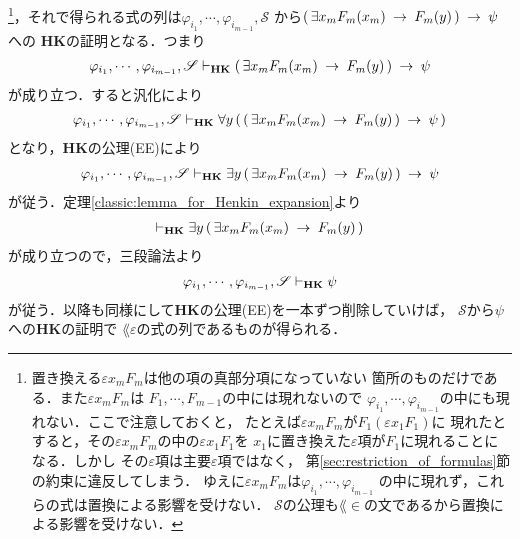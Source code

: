\begin{sketch}
		\footnote{
			置き換える$\varepsilon x_{m} F_{m}$は他の項の真部分項になっていない
			箇所のものだけである．また$\varepsilon x_{m} F_{m}$は
			$F_{1},\cdots,F_{m-1}$の中には現れないので
			$\varphi_{i_{1}},\cdots,\varphi_{i_{m-1}}$の中にも現れない．ここで注意しておくと，
			たとえば$\varepsilon x_{m} F_{m}$が$F_{1}(\varepsilon x_{1} F_{1})$に
			現れたとすると，その$\varepsilon x_{m} F_{m}$の中の$\varepsilon x_{1} F_{1}$を
			$x_{1}$に置き換えた$\varepsilon$項が$F_{1}$に現れることになる．しかし
			その$\varepsilon$項は主要$\varepsilon$項ではなく，
			第\ref{sec:restriction_of_formulas}節の約束に違反してしまう．
			ゆえに$\varepsilon x_{m} F_{m}$は$\varphi_{i_{1}},\cdots,\varphi_{i_{m-1}}$
			の中に現れず，これらの式は置換による影響を受けない．
			$\mathscr{S}$の公理も$\lang{\in}$の文であるから置換による影響を受けない．
		}，それで得られる式の列は$\varphi_{i_{1}},\cdots,\varphi_{i_{m-1}},\mathscr{S}$
		から$(\, \exists x_{m} F_{m}(x_{m}) \hspace{0.25em}\rightarrow\hspace{0.25em} F_{m}(y)\, ) \hspace{0.25em}\rightarrow\hspace{0.25em} \psi$への
		{\bf HK}の証明となる．つまり
		\begin{align}
			\varphi_{i_{1}},\cdots,\varphi_{i_{m-1}},\mathscr{S} 
			\vdash_{{\scriptsize \mbox{{\bf HK}}}} 
			(\, \exists x_{m} F_{m}(x_{m}) \hspace{0.25em}\rightarrow\hspace{0.25em} F_{m}(y)\, ) \hspace{0.25em}\rightarrow\hspace{0.25em} \psi
		\end{align}
		が成り立つ．すると汎化により
		\begin{align}
			\varphi_{i_{1}},\cdots,\varphi_{i_{m-1}},\mathscr{S} 
			\vdash_{{\scriptsize \mbox{{\bf HK}}}} 
			\forall y\, (\, (\, \exists x_{m} F_{m}(x_{m}) \hspace{0.25em}\rightarrow\hspace{0.25em} F_{m}(y)\, ) \hspace{0.25em}\rightarrow\hspace{0.25em} \psi\, )
		\end{align}
		となり，{\bf HK}の公理(EE)により
		\begin{align}
			\varphi_{i_{1}},\cdots,\varphi_{i_{m-1}},\mathscr{S} 
			\vdash_{{\scriptsize \mbox{{\bf HK}}}} 
			\exists y\, (\, \exists x_{m} F_{m}(x_{m}) \hspace{0.25em}\rightarrow\hspace{0.25em} F_{m}(y)\, ) \hspace{0.25em}\rightarrow\hspace{0.25em} \psi
		\end{align}
		が従う．定理\ref{classic:lemma_for_Henkin_expansion}より
		\begin{align}
			\vdash_{{\scriptsize \mbox{{\bf HK}}}} 
			\exists y\, (\, \exists x_{m} F_{m}(x_{m}) \hspace{0.25em}\rightarrow\hspace{0.25em} F_{m}(y)\, )
		\end{align}
		が成り立つので，三段論法より
		\begin{align}
			\varphi_{i_{1}},\cdots,\varphi_{i_{m-1}},\mathscr{S} 
			\vdash_{{\scriptsize \mbox{{\bf HK}}}} \psi
		\end{align}
		が従う．以降も同様にして{\bf HK}の公理(EE)を一本ずつ削除していけば，
		$\mathscr{S}$から$\psi$への{\bf HK}の証明で
		$\lang{\varepsilon}$の式の列であるものが得られる．
		\QED
	\end{sketch}
	
